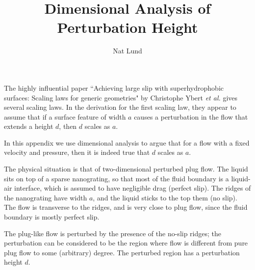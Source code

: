 \documentclass[a4paper]{report}
\title{Dimensional Analysis of Perturbation Height}
\author{Nat Lund}
\begin{document}
\maketitle

The highly influential paper ``Achieving large slip with superhydrophobic surfaces: Scaling laws for generic geometries" by Christophe Ybert \emph{et al.} gives several scaling laws.  In the derivation for the first scaling law, they appear to assume that if a surface feature of width $a$ causes a perturbation in the flow that extends a height $d$, then $d$ scales as $a$.

In this appendix we use dimensional analysis to argue that for a flow with a fixed velocity and pressure, then it is indeed true that $d$ scales as $a$.

\vspace*{1em}
The physical situation is that of two-dimensional perturbed plug flow.  The liquid sits on top of a sparse nanograting, so that most of the fluid boundary is a liquid-air interface, which is assumed to have negligible drag (perfect slip).  The ridges of the nanograting have width $a$, and the liquid sticks to the top them (no slip).  The flow is transverse to the ridges, and is very close to plug flow, since the fluid boundary is mostly perfect slip.

The plug-like flow is perturbed by the presence of the no-slip ridges; the perturbation can be considered to be the region where flow is different from pure plug flow to some (arbitrary) degree.  The perturbed region has a perturbation height $d$. 

\begin{center}
\end{center}
\end{document}
